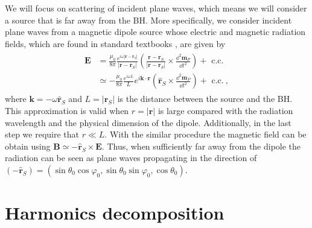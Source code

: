 We will focus on scattering of incident plane waves, which means we will consider a source that is far away from the BH.
More specifically, we consider incident plane waves from a magnetic dipole source whose electric and magnetic radiation fields, which are found in standard textbooks \cite{Jackson1998}, are given by
\begin{align}
    \begin{split}
        \mathbf{E} &= \frac{\mu_0}{8\pi}
        \frac{e^{i\omega|\mathbf{r}-\mathbf{r}_S|}}{|\mathbf{r}-\mathbf{r}_S|} \left(
        \frac{\mathbf{r}-\mathbf{r}_S}{|\mathbf{r}-\mathbf{r}_S|} \times
        \frac{\dd^2 \mathbf{m}_P}{\dd t^2} \right) + \text{ c.c.} \\
        & \simeq  - \frac{\mu_0}{8\pi} \frac{e^{i \omega L}}{L}
        e^{i \mathbf{k} \cdot \mathbf{r}} \left( \mathbf{\hat{r}}_S \times
        \frac{\dd^2 \mathbf{m}_P}{\dd t^2} \right) + \text{ c.c.} ~,
    \end{split}
\end{align}
where $\mathbf{k}= -\omega \mathbf{\hat{r}}_S$ and $L=|\mathbf{r}_S|$ is the distance between the source and the BH.
This approximation is valid when $r=|\mathbf{r}|$ is large compared with the radiation wavelength and the physical dimension of the dipole.
Additionally, in the last step we require that $r \ll L$.
With the similar procedure the magnetic field can be obtain using $\mathbf{B}\simeq - \mathbf{\hat{r}}_S \times \mathbf{E}$.
Thus, when sufficiently far away from the dipole the radiation can be seen as plane waves propagating in the direction of $(- \mathbf{\hat{r}}_S) = (\sin\theta_0 \cos\varphi_0, \sin\theta_0 \sin\varphi_0, \cos\theta_0)$.


\section{Harmonics decomposition}

